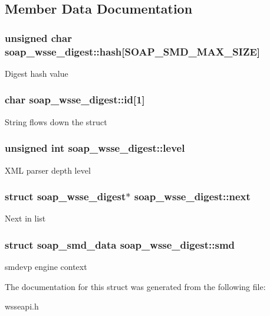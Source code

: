 \subsection{Member Data Documentation}
\hypertarget{structsoap__wsse__digest_a3f5c0f80cb1f005193388aadcacd18f5}{
\subsubsection[{hash}]{\setlength{\rightskip}{0pt plus 5cm}unsigned char {\bf soap\_\-wsse\_\-digest::hash}\mbox{[}SOAP\_\-SMD\_\-MAX\_\-SIZE\mbox{]}}}
\label{structsoap__wsse__digest_a3f5c0f80cb1f005193388aadcacd18f5}
Digest hash value \hypertarget{structsoap__wsse__digest_a544c388eef37eee69c7682d66c2fdd4f}{
\subsubsection[{id}]{\setlength{\rightskip}{0pt plus 5cm}char {\bf soap\_\-wsse\_\-digest::id}\mbox{[}1\mbox{]}}}
\label{structsoap__wsse__digest_a544c388eef37eee69c7682d66c2fdd4f}
String flows down the struct \hypertarget{structsoap__wsse__digest_a37bf7969173878e54c311b6484af54fb}{
\subsubsection[{level}]{\setlength{\rightskip}{0pt plus 5cm}unsigned int {\bf soap\_\-wsse\_\-digest::level}}}
\label{structsoap__wsse__digest_a37bf7969173878e54c311b6484af54fb}
XML parser depth level \hypertarget{structsoap__wsse__digest_a13360889b01e19791f5f28884f0a22a8}{
\subsubsection[{next}]{\setlength{\rightskip}{0pt plus 5cm}struct {\bf soap\_\-wsse\_\-digest}$\ast$ {\bf soap\_\-wsse\_\-digest::next}}}
\label{structsoap__wsse__digest_a13360889b01e19791f5f28884f0a22a8}
Next in list \hypertarget{structsoap__wsse__digest_a15e6a918067d5f6d575478751733523f}{
\subsubsection[{smd}]{\setlength{\rightskip}{0pt plus 5cm}struct {\bf soap\_\-smd\_\-data} {\bf soap\_\-wsse\_\-digest::smd}}}
\label{structsoap__wsse__digest_a15e6a918067d5f6d575478751733523f}
smdevp engine context 

The documentation for this struct was generated from the following file:\begin{DoxyCompactItemize}
\item 
wsseapi.h\end{DoxyCompactItemize}
